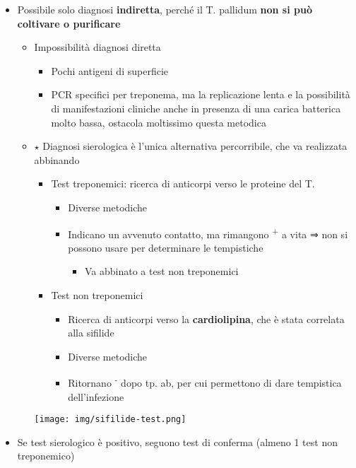 \documentclass[italian,]{article}
\providecommand{\tightlist}{%
  \setlength{\itemsep}{0pt}\setlength{\parskip}{0pt}}
\newcommand{\goldstandard}{\textcircled{$\star$} }                      %
\begin{document}
\begin{itemize}
\tightlist
\item
  Possibile solo diagnosi \textbf{indiretta}, perché il T. pallidum
  \textbf{non si può coltivare o purificare}

  \begin{itemize}
  \tightlist
  \item
    Impossibilità diagnosi diretta

    \begin{itemize}
    \tightlist
    \item
      Pochi antigeni di superficie
    \item
      PCR specifici per treponema, ma la replicazione lenta e la
      possibilità di manifestazioni cliniche anche in presenza di una
      carica batterica molto bassa, ostacola moltissimo questa metodica
    \end{itemize}
  \item
    \goldstandard Diagnosi sierologica è l'unica alternativa
    percorribile, che va realizzata abbinando

    \begin{itemize}
    \tightlist
    \item
      Test treponemici: ricerca di anticorpi verso le proteine del T.

      \begin{itemize}
      \tightlist
      \item
        Diverse metodiche
      \item
        Indicano un avvenuto contatto, ma rimangono \textsuperscript{+}
        a vita ⇒ non si possono usare per determinare le tempistiche

        \begin{itemize}
        \tightlist
        \item
          Va abbinato a test non treponemici
        \end{itemize}
      \end{itemize}
    \item
      Test non treponemici

      \begin{itemize}
      \tightlist
      \item
        Ricerca di anticorpi verso la \textbf{cardiolipina}, che è stata
        correlata alla sifilide
      \item
        Diverse metodiche
      \item
        Ritornano \textsuperscript{-} dopo tp. ab, per cui permettono di
        dare tempistica dell'infezione
      \end{itemize}
    \end{itemize}

    \texttt{[image: img/sifilide-test.png]}
  \end{itemize}
\item
  Se test sierologico è positivo, seguono test di conferma (almeno 1
  test non treponemico)
\end{itemize}
\end{document}
